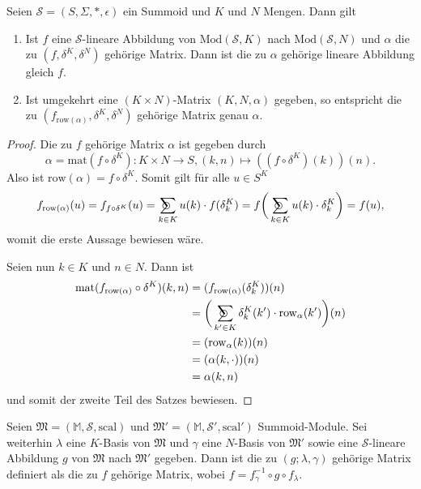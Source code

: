 \documentclass{article}
\DeclareMathOperator*{\sumcirc}{%
  \ThisStyle{\mathop{\ensurestackMath{\stackinset{c}{-1.5\LMpt}{c}{}{%
  \rotatebox[origin=lb]{-90}{$\SavedStyle\scalerel*{\bm\Circle}{%
  i}$}}{\SavedStyle\sum}}}}}
\begin{document}
\begin{theorem}
  Seien $\mathcal{S} = (S, \Sigma, \ast, \epsilon)$ ein Summoid und $K$ und $N$ Mengen.
  Dann gilt
  \begin{enumerate}
    \item Ist $f$ eine $\mathcal{S}$-lineare Abbildung von $\text{Mod}(\mathcal{S}, K)$ nach $\text{Mod}(\mathcal{S}, N)$
          und $\alpha$ die zu $(f, \delta^K, \delta^N)$ gehörige Matrix.
          Dann ist die zu $\alpha$ gehörige lineare Abbildung gleich $f$.
    \item Ist umgekehrt eine $(K \times N)$-Matrix $(K, N, \alpha)$ gegeben,
          so entspricht die zu $(f_{\text{row}(\alpha)}, \delta^K, \delta^N)$
          gehörige Matrix genau $\alpha$. 
  \end{enumerate}
\end{theorem}
\begin{proof}
  Die zu $f$ gehörige Matrix $\alpha$ ist gegeben durch
  \begin{equation*}
    \alpha = \text{mat}(f \circ \delta^K) \colon K \times N \to S, (k, n) \mapsto ((f \circ \delta^K)(k))(n).
  \end{equation*}
  Also ist $\text{row}(\alpha) = f \circ \delta^K$.
  Somit gilt für alle $u \in S^K$
  \begin{equation*}
    f_{\text{row}(\alpha)}(u)
    = f_{f \circ \delta^K}(u)
    = \sumcirc_{k \in K}u(k) \cdot f(\delta^K_k)
    = f \bigg( \sumcirc_{k \in K}u(k) \cdot \delta^K_k \bigg)
    = f(u),
  \end{equation*}
  womit die erste Aussage bewiesen wäre.

  Seien nun $k \in K$ und $n \in N$. Dann ist
  \begin{align*}
    \text{mat}(f_{\text{row}(\alpha)} \circ \delta^K)(k, n)
    &= (f_{\text{row}(\alpha)}(\delta^K_k))(n) \\
    &= \bigg(\sumcirc_{k' \in K} \delta^K_k(k') \cdot \text{row}_\alpha(k')\bigg)(n) \\
    &= (\text{row}_\alpha(k))(n) \\
    &= (\alpha(k, \cdot))(n) \\
    &= \alpha(k, n)
  \end{align*}
  und somit der zweite Teil des Satzes bewiesen.
\end{proof}

\begin{definition}
  Seien $\mathfrak{M} = (\mathbb{M}, \mathcal{S}, \text{scal})$ und $\mathfrak{M}' = (\mathbb{M}, \mathcal{S}', \text{scal}')$ Summoid-Module.
  Sei weiterhin $\lambda$ eine $K$-Basis von $\mathfrak{M}$
  und $\gamma$ eine $N$-Basis von $\mathfrak{M}'$
  sowie eine $\mathcal{S}$-lineare Abbildung $g$ von $\mathfrak{M}$ nach $\mathfrak{M}'$ gegeben.
  Dann ist die zu $(g;\lambda, \gamma)$ gehörige Matrix definiert
  als die zu $f$ gehörige Matrix,
  wobei $f = f_\gamma^{-1} \circ g \circ f_\lambda$.
\end{definition}
\end{document}

